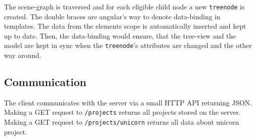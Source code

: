 The scene-graph is traversed and for each eligible child node a new
\texttt{treenode} is created. The double braces are angular's way
to denote data-binding in templates. The data from the elements scope is
automatically inserted and kept up to date. Then, the data-binding would
ensure, that the tree-view and the model are kept in sync when the
\texttt{treenode}'s attributes are changed and the other way around.

\subsection{Communication}
\label{interaction}

The client communicates with the server via a small HTTP API returning \gls{JSON}.
Making a GET request to \texttt{/projects} returns all projects stored on the server.
Making a GET request to \texttt{/projects/unicorn} returns all data about unicorn project.
